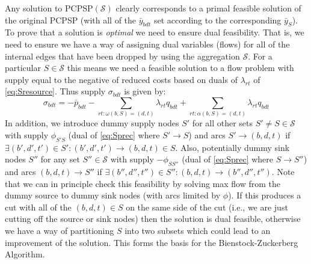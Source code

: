 \documentclass[authoryear,11pt,square,number,times,super,comma]{elsarticle}
\def\by{\bar{y}}
\begin{document}
Any solution to PCPSP$(\mathcal{S})$ clearly corresponds to a primal feasible
solution of the original PCPSP (with all of the $\by_{bdt}$ set according to
the corresponding $\by_S$). To prove that a solution is \emph{optimal} we need
to ensure dual feasibility. That is, we need to ensure we have a way of
assigning dual variables (flows) for all of the internal edges that have been
dropped by using the aggregation $\mathcal{S}$. For a particular
$S\in\mathcal{S}$ this means we need a feasible solution to a flow problem
with supply equal to the negative of reduced costs based on duals of
$\lambda_{rt}$ of \eqref{eq:Sresource}. Thus supply $\sigma_{bdt}$ is given by:
\begin{equation} \label{eq:Ssupply}
  \sigma_{bdt}=-\bar p_{bdt} -
  \sum_{rt:\omega(b,S)=(d,t)}\lambda_{rt}q_{bdt}%
  +\sum_{rt:\alpha(b,S)=(d,t)} \lambda_{rt}q_{bdt}%
\end{equation}
In addition, we introduce dummy supply nodes $S'$ for all other sets
$S'\ne S\in\mathcal{S}$ with supply $\phi_{S'S}$ (dual of \eqref{eq:Sprec}
where $S'\rightarrow S$) and arcs
$S'\rightarrow(b,d,t)$ if $\exists (b',d',t')\in
S':(b',d',t')\rightarrow(b,d,t)\in S$. Also, potentially dummy sink nodes $S''$
for any set $S''\in\mathcal{S}$ with supply $-\phi_{SS''}$  (dual of
\eqref{eq:Sprec} where $S\rightarrow S''$) and arcs $(b,d,t)\rightarrow S''$ if
$\exists (b'',d'',t'')\in S'':(b,d,t)\rightarrow{}(b'',d'',t'')$.
Note that we can in principle check this feasibility by solving max flow from
the dummy source to dummy sink nodes (with arcs limited by $\phi$). If this
produces a cut with all of the $(b,d,t)\in S$ on the same side of the cut (i.e.,
we are just cutting off the source or sink nodes) then the solution is dual
feasible, otherwise we have a way of partitioning $S$ into two subsets which
could lead to an improvement of the solution. This forms the basis for the Bienstock-Zuckerberg Algorithm.
\end{document}
